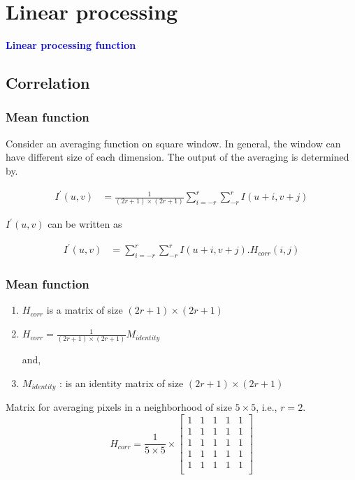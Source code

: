 \documentclass[english,11pt,table,handout]{beamer}
\begin{document}
\section{Linear processing}
\frame
{
	\Huge
	\begin{center}
		\textcolor{blue}{\textbf{Linear processing function}}
	\end{center}
}

\subsection{Correlation}
\frame
{
	\frametitle{Mean function}
	Consider an averaging function on square window. In general, the window can have different size of each dimension. The output of the averaging is determined by.
	
	\begin{equation*} 
	\begin{split}
	I^{'}{(u,v)} &= \frac{1}{(2r+1) \times (2r+1)} \sum_{i=-r}^{r}{\sum_{-r}^{r}{I(u+i, v+j)}}
	\end{split}
	\end{equation*}
	
	$I^{'}(u,v)$ can be written as
	
	\begin{equation*} 
	\begin{split}
	I^{'}{(u,v)}	&= \sum_{i=-r}^{r}{\sum_{-r}^{r}{I(u+i, v+j).H_{corr}{(i,j)}}}
	\end{split}
	\end{equation*}
}
\frame
{
	\frametitle{Mean function}
	\begin{enumerate}
		\item $H_{corr}$ is a matrix of size $(2r+1) \times (2r+1)$ 
		\item $H_{corr} = \frac{1}{(2r+1) \times (2r+1)} M_{identity}$
		
		and,
		\item $M_{identity}$ : is an identity matrix of size $(2r+1) \times (2r+1)$
	
	\end{enumerate}
	
	\begin{example}
	Matrix for averaging pixels in a neighborhood of size $5 \times 5$, i.e., $r= 2$.
	$$
		H_{corr} = \frac{1}{5 \times 5} \times 
		\begin{bmatrix}
			1 & 1 & 1 & 1 & 1 \\
			1 & 1 & 1 & 1 & 1 \\
			1 & 1 & 1 & 1 & 1 \\
			1 & 1 & 1 & 1 & 1 \\
			1 & 1 & 1 & 1 & 1 \\
		\end{bmatrix}
	$$
	\end{example}
}
\end{document}
